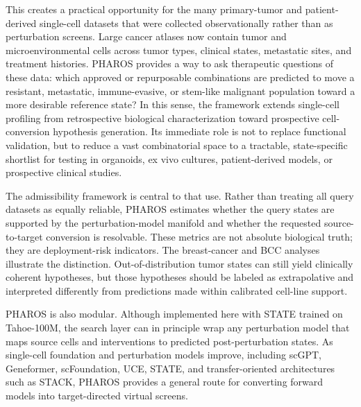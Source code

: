 \documentclass[11pt,a4paper]{article}
\begin{document}
This creates a practical opportunity for the many primary-tumor and patient-derived single-cell datasets that were collected observationally rather than as perturbation screens. Large cancer atlases now contain tumor and microenvironmental cells across tumor types, clinical states, metastatic sites, and treatment histories\cite{Tyler2025, Reveron-Thornton2026}. PHAROS provides a way to ask therapeutic questions of these data: which approved or repurposable combinations are predicted to move a resistant, metastatic, immune-evasive, or stem-like malignant population toward a more desirable reference state? In this sense, the framework extends single-cell profiling from retrospective biological characterization toward prospective cell-conversion hypothesis generation. Its immediate role is not to replace functional validation, but to reduce a vast combinatorial space to a tractable, state-specific shortlist for testing in organoids, ex vivo cultures, patient-derived models, or prospective clinical studies.

The admissibility framework is central to that use. Rather than treating all query datasets as equally reliable, PHAROS estimates whether the query states are supported by the perturbation-model manifold and whether the requested source-to-target conversion is resolvable. These metrics are not absolute biological truth; they are deployment-risk indicators. The breast-cancer and BCC analyses illustrate the distinction. Out-of-distribution tumor states can still yield clinically coherent hypotheses, but those hypotheses should be labeled as extrapolative and interpreted differently from predictions made within calibrated cell-line support.

PHAROS is also modular. Although implemented here with STATE trained on Tahoe-100M, the search layer can in principle wrap any perturbation model that maps source cells and interventions to predicted post-perturbation states. As single-cell foundation and perturbation models improve, including scGPT, Geneformer, scFoundation, UCE, STATE, and transfer-oriented architectures such as STACK\cite{Cui2024, Theodoris2023, Hao2024, Adduri2025, Dong2026, Rosen2026}, PHAROS provides a general route for converting forward models into target-directed virtual screens.
\end{document}
